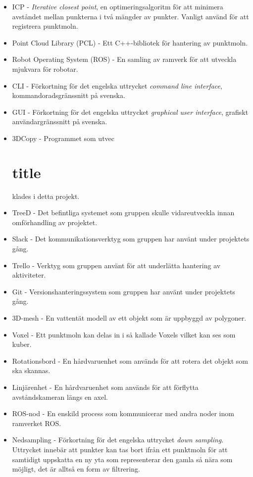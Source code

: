 \begin{itemize}
	\item ICP - \textit{Iterative closest point}, en optimeringsalgoritm för att minimera avståndet mellan punkterna i två mängder av punkter. Vanligt använd för att registrera punktmoln.
	\item Point Cloud Library (PCL) - Ett C++-bibliotek för hantering av punktmoln.
	\item Robot Operating System (ROS) - En samling av ramverk för att utveckla mjukvara för robotar.
	\item CLI - Förkortning för det engelska uttrycket \textit{command line interface}, kommandoradsgränssnitt på svenska.
	\item GUI - Förkortning för det engelska uttrycket \textit{graphical user interface}, grafiskt användargränssnitt på svenska.
	\item 3DCopy - Programmet som utvec\part{title}klades i detta projekt.
	\item TreeD - Det befintliga systemet som gruppen skulle vidareutveckla innan omförhandling av projektet.
	\item Slack - Det kommunikationsverktyg som gruppen har använt under projektets gång.
	\item Trello - Verktyg som gruppen använt för att underlätta hantering av aktiviteter.
	\item Git - Versionshanteringssystem som gruppen har använt under projektets gång.
	\item 3D-mesh - En vattentät modell av ett objekt som är uppbyggd av polygoner.
	\item Voxel - Ett punktmoln kan delas in i så kallade Voxels vilket kan ses som kuber.
	\item Rotationsbord - En hårdvaruenhet som används för att rotera det objekt som ska skannas.
	\item Linjärenhet - En hårdvaruenhet som används för att förflytta avståndskameran längs en axel.
	\item ROS-nod - En enskild process som kommunicerar med andra noder inom ramverket ROS.
	\item Nedsampling - Förkortning för det engelska uttrycket \textit{down sampling}. Uttrycket innebär att punkter kan tas bort ifrån ett punktmoln för att samtidigt uppskatta en ny yta som representerar den gamla så nära som möjligt, det är alltså en form av filtrering.
\end{itemize} 



